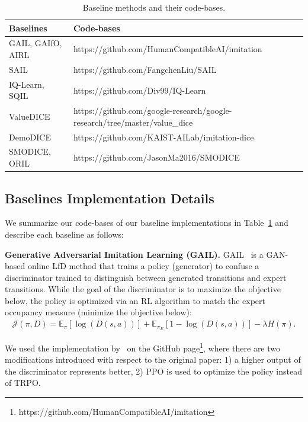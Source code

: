 \begin{table}[htbp]
  \centering
  \small 
  \caption{Baseline methods and their code-bases. }
    \begin{tabular}{ll}
    \toprule
    Baselines \ \ \  & Code-bases \\
    \midrule
    GAIL, GAIfO, AIRL & https://github.com/HumanCompatibleAI/imitation \\
    SAIL & https://github.com/FangchenLiu/SAIL \\
    IQ-Learn, SQIL  & https://github.com/Div99/IQ-Learn \\
    ValueDICE & https://github.com/google-research/google-research/tree/master/value\_dice\\
    DemoDICE & https://github.com/KAIST-AILab/imitation-dice \\
    SMODICE, ORIL & https://github.com/JasonMa2016/SMODICE\\
    \bottomrule
    \end{tabular}%
  \label{app:tab:baselines-imp}%
\end{table}%



\subsection{Baselines Implementation Details}
\label{app:sec:baselines_implementation_details}

We summarize our code-bases of our baseline implementations in Table~\ref{app:tab:baselines-imp} and describe each baseline as follows: 

\textbf{Generative Adversarial Imitation Learning (GAIL).} 
GAIL~\citep{ho2016generative} is a GAN-based online LfD method that trains a policy (generator) to confuse a discriminator trained to distinguish between generated transitions and expert transitions. 
While the goal of the discriminator is to maximize the objective below, the policy is optimized via an RL algorithm to match the expert occupancy measure (minimize the objective below):
\begin{align}
    \mathcal{J}(\pi, D)=\mathbb{E}_{\pi}\left[{\log(D(s,a))}\right] + \mathbb{E}_{\pi_E}\left[{1-\log(D(s,a))}\right] - \lambda H(\pi). \nonumber 
\end{align}

We used the implementation by~\citet{gleave2022imitation} on the GitHub page\footnote{https://github.com/HumanCompatibleAI/imitation}, where there are two modifications introduced with respect to the original paper: 1) a higher output of the discriminator represents better, 2) PPO is used to optimize the policy instead of TRPO.

